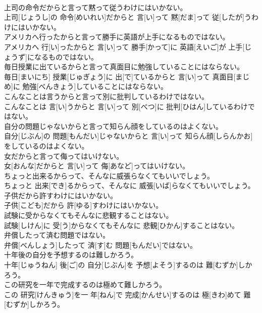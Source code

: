 \documentclass[8pt]{extreport}
\begin{document}
\begin{CJK}{UTF8}{min}
\\	上司の命令だからと言って黙って従うわけにはいかない。	
\\	上司[じょうし]の 命令[めいれい]だからと 言[い]って 黙[だま]って 従[したが]うわけにはいかない。
\\	アメリカへ行ったからと言って勝手に英語が上手になるものではない。	
\\	アメリカへ 行[い]ったからと 言[い]って 勝手[かって]に 英語[えいご]が 上手[じょうず]になるものではない。
\\	毎日授業に出ているからと言って真面目に勉強していることにはならない。	
\\	毎日[まいにち] 授業[じゅぎょう]に 出[で]ているからと 言[い]って 真面目[まじめ]に 勉強[べんきょう]していることにはならない。
\\	こんなことは言うからと言って別に批判しているわけではない。	
\\	こんなことは 言[い]うからと 言[い]って 別[べつ]に 批判[ひはん]しているわけではない。
\\	自分の問題じゃないからと言って知らん顔をしているのはよくない。	
\\	自分[じぶん]の 問題[もんだい]じゃないからと 言[い]って 知らん顔[しらんかお]をしているのはよくない。
\\	女だからと言って侮ってはいけない。	
\\	女[おんな]だからと 言[い]って 侮[あなど]ってはいけない。
\\	ちょっと出来るからって、そんなに威張らなくてもいいでしょう。	
\\	ちょっと 出来[でき]るからって、そんなに 威張[いば]らなくてもいいでしょう。
\\	子供だから許すわけにはいかない。	
\\	子供[こども]だから 許[ゆる]すわけにはいかない。
\\	試験に受からなくてもそんなに悲観することはない。	
\\	試験[しけん]に 受[う]からなくてもそんなに 悲観[ひかん]することはない。
\\	弁償したって済む問題ではない。	
\\	弁償[べんしょう]したって 済[す]む 問題[もんだい]ではない。
\\	十年後の自分を予想するのは難しかろう。	
\\	十年[じゅうねん] 後[ご]の 自分[じぶん]を 予想[よそう]するのは 難[むずか]しかろう。
\\	この研究を一年で完成するのは極めて難しかろう。	
\\	この 研究[けんきゅう]を一 年[ねん]で 完成[かんせい]するのは 極[きわ]めて 難[むずか]しかろう。

\end{CJK}
\end{document}
